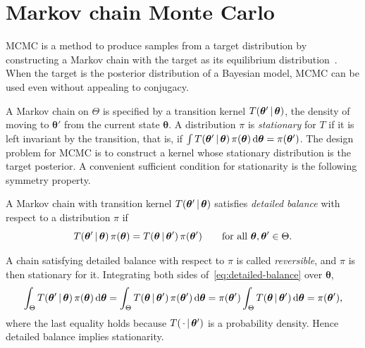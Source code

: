 \section{Markov chain Monte Carlo}
\label{sec:mcmc-idea}

MCMC is a method to produce samples from a target distribution by constructing a Markov chain with the target as its equilibrium distribution~\citep{brooks2011handbook, givens2013computational}. When the target is the posterior distribution of a Bayesian model, MCMC can be used even without appealing to conjugacy.


A Markov chain on $\Theta$ is specified by a transition kernel
$T(\bm{\theta}' \,|\, \bm{\theta})$, the density of moving to
$\bm{\theta}'$ from the current state $\bm{\theta}$. A distribution
$\pi$ is \emph{stationary} for $T$ if it is left invariant by the
transition, that is, if
$\int T(\bm{\theta}' \,|\, \bm{\theta})\,\pi(\bm{\theta})
\,\mathrm{d}\bm{\theta} = \pi(\bm{\theta}')$. The design problem for MCMC is to
construct a kernel whose stationary distribution is the target
posterior. A convenient sufficient condition for stationarity is the
following symmetry property.

\begin{definition}
\label{def:detailed-balance}
A Markov chain with transition kernel
$T(\bm{\theta}' \,|\, \bm{\theta})$ satisfies \emph{detailed balance}
with respect to a distribution $\pi$ if
%
\begin{equation}
  T(\bm{\theta}' \,|\, \bm{\theta})\,\pi(\bm{\theta})
  = T(\bm{\theta} \,|\, \bm{\theta}')\,\pi(\bm{\theta}')
  \qquad \text{for all } \bm{\theta}, \bm{\theta}' \in \Theta.
  \label{eq:detailed-balance}
\end{equation}
\end{definition}

A chain satisfying detailed balance with respect to $\pi$ is called
\emph{reversible}, and $\pi$ is then stationary for it. Integrating
both sides of~\eqref{eq:detailed-balance} over $\bm{\theta}$,
%
\begin{equation}
  \int_{\Theta} T(\bm{\theta}' \,|\, \bm{\theta})\,\pi(\bm{\theta})
  \,\mathrm{d}\bm{\theta}
  = \int_{\Theta} T(\bm{\theta} \,|\, \bm{\theta}')\,\pi(\bm{\theta}')
  \,\mathrm{d}\bm{\theta}
  = \pi(\bm{\theta}') \int_{\Theta} T(\bm{\theta} \,|\, \bm{\theta}')
  \,\mathrm{d}\bm{\theta}
  = \pi(\bm{\theta}'),
\end{equation}
%
where the last equality holds because $T(\,\cdot \,|\,
\bm{\theta}')$ is a probability density. Hence detailed balance
implies stationarity.

